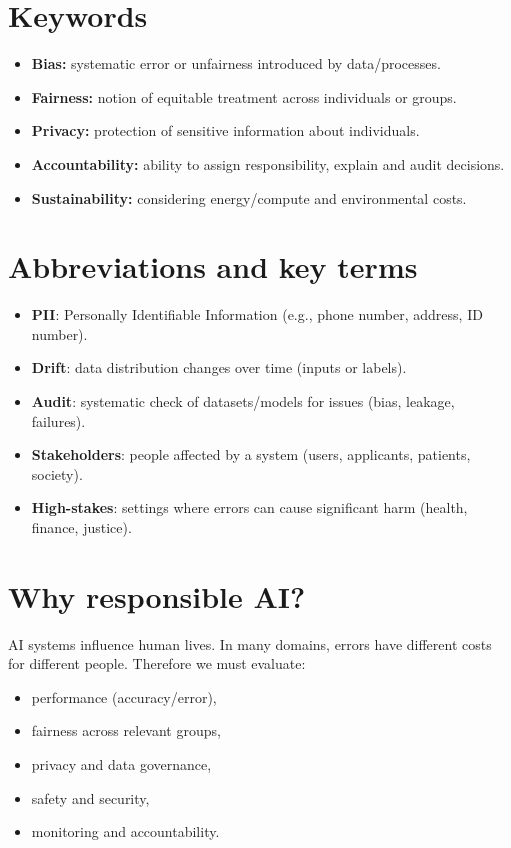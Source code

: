 \documentclass[11pt]{article}
\begin{document}
\section{Keywords}
\begin{itemize}[leftmargin=*]
  \item \textbf{Bias:} systematic error or unfairness introduced by data/processes.
  \item \textbf{Fairness:} notion of equitable treatment across individuals or groups.
  \item \textbf{Privacy:} protection of sensitive information about individuals.
  \item \textbf{Accountability:} ability to assign responsibility, explain and audit decisions.
  \item \textbf{Sustainability:} considering energy/compute and environmental costs.
\end{itemize}

\section{Abbreviations and key terms}
\begin{itemize}[leftmargin=*]
  \item \textbf{PII}: Personally Identifiable Information (e.g., phone number, address, ID number).
  \item \textbf{Drift}: data distribution changes over time (inputs or labels).
  \item \textbf{Audit}: systematic check of datasets/models for issues (bias, leakage, failures).
  \item \textbf{Stakeholders}: people affected by a system (users, applicants, patients, society).
  \item \textbf{High-stakes}: settings where errors can cause significant harm (health, finance, justice).
\end{itemize}

\section{Why responsible AI?}
AI systems influence human lives. In many domains, errors have different costs for different people.
Therefore we must evaluate:
\begin{itemize}[leftmargin=*]
  \item performance (accuracy/error),
  \item fairness across relevant groups,
  \item privacy and data governance,
  \item safety and security,
  \item monitoring and accountability.
\end{itemize}
\end{document}
